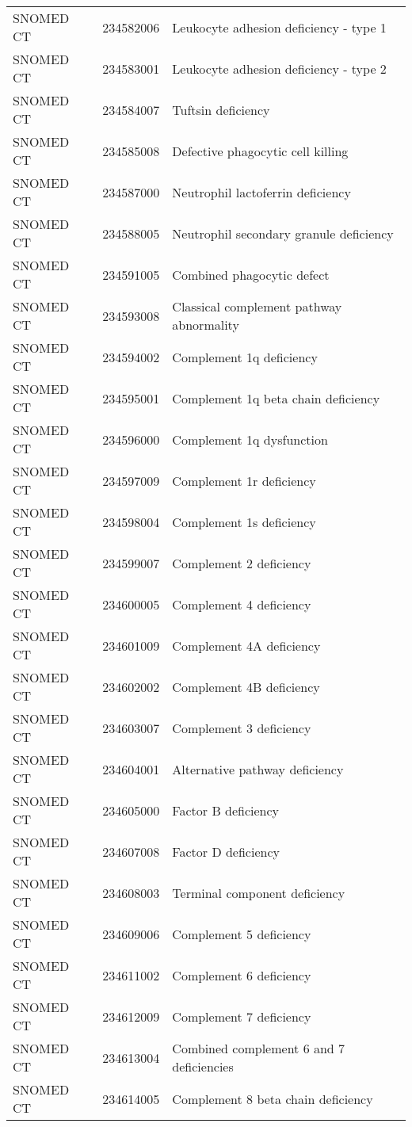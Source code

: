 \begin{table}[ht]
\begin{tabular}{lll}
  SNOMED CT & 234582006 & Leukocyte adhesion deficiency - type 1 \\ 
  SNOMED CT & 234583001 & Leukocyte adhesion deficiency - type 2 \\ 
  SNOMED CT & 234584007 & Tuftsin deficiency \\ 
  SNOMED CT & 234585008 & Defective phagocytic cell killing \\ 
  SNOMED CT & 234587000 & Neutrophil lactoferrin deficiency \\ 
  SNOMED CT & 234588005 & Neutrophil secondary granule deficiency \\ 
  SNOMED CT & 234591005 & Combined phagocytic defect \\ 
  SNOMED CT & 234593008 & Classical complement pathway abnormality \\ 
  SNOMED CT & 234594002 & Complement 1q deficiency \\ 
  SNOMED CT & 234595001 & Complement 1q beta chain deficiency \\ 
  SNOMED CT & 234596000 & Complement 1q dysfunction \\ 
  SNOMED CT & 234597009 & Complement 1r deficiency \\ 
  SNOMED CT & 234598004 & Complement 1s deficiency \\ 
  SNOMED CT & 234599007 & Complement 2 deficiency \\ 
  SNOMED CT & 234600005 & Complement 4 deficiency \\ 
  SNOMED CT & 234601009 & Complement 4A deficiency \\ 
  SNOMED CT & 234602002 & Complement 4B deficiency \\ 
  SNOMED CT & 234603007 & Complement 3 deficiency \\ 
  SNOMED CT & 234604001 & Alternative pathway deficiency \\ 
  SNOMED CT & 234605000 & Factor B deficiency \\ 
  SNOMED CT & 234607008 & Factor D deficiency \\ 
  SNOMED CT & 234608003 & Terminal component deficiency \\ 
  SNOMED CT & 234609006 & Complement 5 deficiency \\ 
  SNOMED CT & 234611002 & Complement 6 deficiency \\ 
  SNOMED CT & 234612009 & Complement 7 deficiency \\ 
  SNOMED CT & 234613004 & Combined complement 6 and 7 deficiencies \\ 
  SNOMED CT & 234614005 & Complement 8 beta chain deficiency \\ 

\end{tabular}
\end{table}
